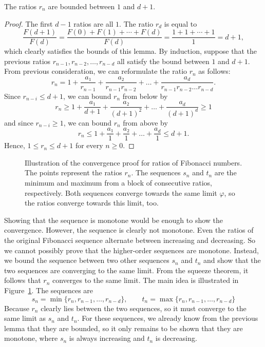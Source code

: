 \begin{lemma}
  The ratios $r_n$ are bounded between $1$ and $d+1$.
\end{lemma}

\begin{proof}
  The first $d - 1$ ratios are all $1$.
  The ratio $r_d$ is equal to
  \[
    \frac{F(d+1)}{F(d)} = \frac{F(0) + F(1) + ⋯ + F(d)}{F(d)} = \frac{1 + 1 + ⋯ + 1}{1} = d + 1,
  \]
  which clearly satisfies the bounds of this lemma.
  By induction, suppose that the previous ratios $r_{n-1}, r_{n-2}, …, r_{n-d}$
  all satisfy the bound between $1$ and $d+1$.
  From previous consideration, we can reformulate the ratio $r_n$ as follows:
  \[
    r_n = 1 + \frac{a₁}{r_{n-1}} + \frac{a₂}{r_{n-1} r_{n-2}} + \dots + \frac{a_d}{r_{n-1} r_{n-2} \dots r_{n-d}}.
  \]
  Since $r_{n-i} ≤ d+1$, we can bound $r_n$ from below by
  \[
    r_n ≥ 1 + \frac{a₁}{d+1} + \frac{a₂}{(d+1)^2} + \dots + \frac{a_d}{(d+1)^d} ≥ 1
  \]
  and since $r_{n-i} ≥ 1$, we can bound $r_n$ from above by
  \[
    r_n ≤ 1 + \frac{a₁}{1} + \frac{a₂}{1} + \dots + \frac{a_d}{1} ≤ d+1.
  \]
  Hence, $1 ≤ r_n ≤ d+1$ for every $n ≥ 0$.
\end{proof}

\begin{figure}[tbp]
  \centering
  
  \caption{
    Illustration of the convergence proof for ratios of Fibonacci numbers.
    The points represent the ratios $r_n$.
    The sequences $s_n$ and $t_n$ are the minimum and maximum from a block of
    consecutive ratios, respectively.
    Both sequences converge towards the same limit $φ$, so the ratios converge
    towards this limit, too.
  }
  \label{fig:fibonacci-convergence}
\end{figure}

Showing that the sequence is monotone would be enough to show the convergence.
However, the sequence is clearly not monotone.
Even the ratios of the original Fibonacci sequence alternate between increasing
and decreasing.
So we cannot possibly prove that the higher-order sequences are monotone.
Instead, we bound the sequence between two other sequences $s_n$ and $t_n$
and show that the two sequences are converging to the same limit.
From the squeeze theorem, it follows that $r_n$ converges to the same limit.
The main idea is illustrated in Figure~\ref{fig:fibonacci-convergence}.
The sequences are
\[
  s_n = \min\{r_n, r_{n-1}, …, r_{n-d} \}, \qquad t_n = \max\{r_n, r_{n-1}, …, r_{n-d}\}
\]
Because $r_n$ clearly lies between the two sequences, so it must converge to the same limit as $s_n$ and $t_n$.
For these sequences, we already know from the previous lemma that they are bounded,
so it only remains to be shown that they are monotone,
where $s_n$ is always increasing and $t_n$ is decreasing.

